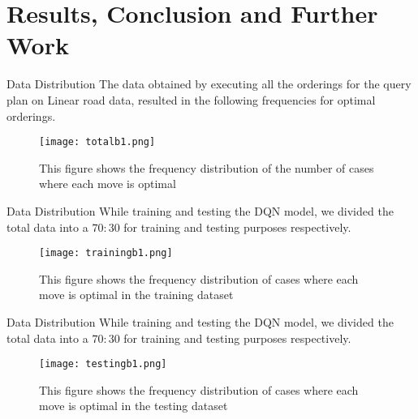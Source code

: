 
\section{Results, Conclusion and Further Work}
\frame{\sectionpage}

\begin{frame}{Data Distribution}
    The data obtained by executing all the orderings for the query plan on Linear road data, resulted in the following frequencies for optimal orderings.
    \begin{figure}
        \centering
        \texttt{[image: totalb1.png]}\\
        \caption{This figure shows the frequency distribution of the number of cases where each move is optimal}
        \label{fig:totalb1}
    \end{figure}
\end{frame}


\begin{frame}{Data Distribution}
    While training and testing the DQN model, we divided the total data into a $70:30$ for training and testing purposes respectively.
    \begin{figure}
        \centering
        \texttt{[image: trainingb1.png]}\\
        \caption{This figure shows the frequency distribution of cases where each move is optimal in the training dataset}
        \label{fig:trainingb1}
    \end{figure}
\end{frame}

\begin{frame}{Data Distribution}
    While training and testing the DQN model, we divided the total data into a $70:30$ for training and testing purposes respectively.
    \begin{figure}
        \centering
        \texttt{[image: testingb1.png]}\\
        \caption{This figure shows the frequency distribution of cases where each move is optimal in the testing dataset}
        \label{fig:testingb1}
    \end{figure}
\end{frame}

